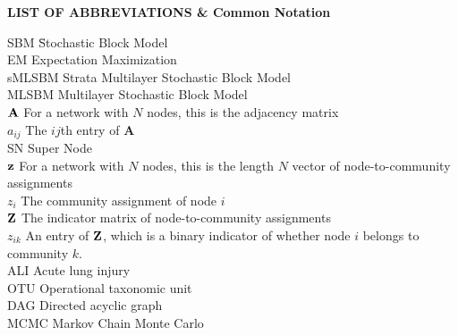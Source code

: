 {}

\begin{center}
{\Large \textbf{LIST OF ABBREVIATIONS \& Common Notation}}
\end{center}

\newcommand{\Ab}[2]{\noindent  #1 \> #2 \\}
\newcommand{\Abi}[2]{\noindent #1 \hspace{1.5cm} \= #2 \\}

\begin{tabbing}
\Abi{SBM}{Stochastic Block Model}
\Ab{EM}{Expectation Maximization}
\Ab{sMLSBM}{Strata Multilayer Stochastic Block Model}
\Ab{MLSBM}{Multilayer Stochastic Block Model}
\Ab{${\bf A}$}{For a network with $N$ nodes, this is the adjacency matrix}
\Ab{$a_{ij}$}{The $ij$th entry of {\bf A}}
\Ab{SN}{Super Node}
\Ab{${\bf z}$}{For a network with $N$ nodes, this is the length $N$ vector of node-to-community assignments}
\Ab{$z_{i}$}{The community assignment of node $i$}
\Ab{${\bf Z}$}{The indicator matrix of node-to-community assignments}
\Ab{$z_{ik}$}{An entry of ${\bf Z}$, which is a binary indicator of whether node $i$ belongs to community $k$.}
\Ab{ALI}{Acute lung injury}
\Ab{OTU}{Operational taxonomic unit}
\Ab{DAG}{Directed acyclic graph}
\Ab{MCMC}{Markov Chain Monte Carlo}
\end{tabbing}

\clearpage
